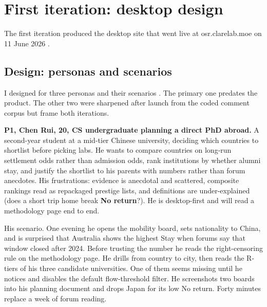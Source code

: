 \section{First iteration: desktop design}
\label{sec:iteration1}

The first iteration produced the desktop site that went live at osr.clarelab.moe on 11 June 2026 \cite{osr}.

\subsection{Design: personas and scenarios}

I designed for three personas and their scenarios \cite{benyon}. The primary one predates the product. The other two were sharpened after launch from the coded comment corpus but frame both iterations.

\textbf{P1, Chen Rui, 20, CS undergraduate planning a direct PhD abroad.} A second-year student at a mid-tier Chinese university, deciding which countries to shortlist before picking labs. He wants to compare countries on long-run settlement odds rather than admission odds, rank institutions by whether alumni stay, and justify the shortlist to his parents with numbers rather than forum anecdotes. His frustrations: evidence is anecdotal and scattered, composite rankings read as repackaged prestige lists, and definitions are under-explained (does a short trip home break \textbf{No return}?). He is desktop-first and will read a methodology page end to end.

His scenario. One evening he opens the mobility board, sets nationality to China, and is surprised that Australia shows the highest Stay when forums say that window closed after 2024. Before trusting the number he reads the right-censoring rule on the methodology page. He drills from country to city, then reads the R-tiers of his three candidate universities. One of them seems missing until he notices and disables the default flow-threshold filter. He screenshots two boards into his planning document and drops Japan for its low No return. Forty minutes replace a week of forum reading.

